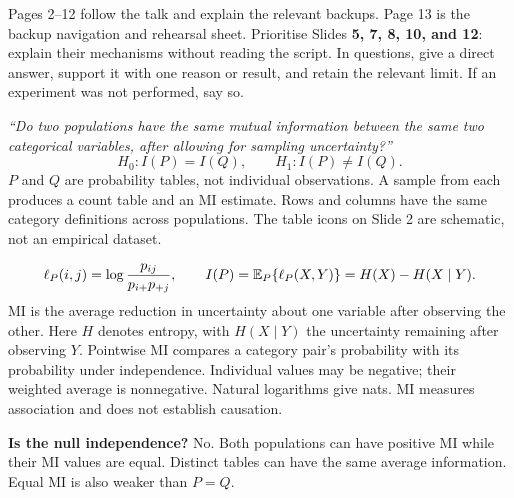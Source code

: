 Pages 2--12 follow the talk and explain the relevant backups. Page 13 is the backup navigation and rehearsal sheet. Prioritise Slides \textbf{5, 7, 8, 10, and 12}: explain their mechanisms without reading the script. In questions, give a direct answer, support it with one reason or result, and retain the relevant limit. If an experiment was not performed, say so.

\newpage
{}

\emph{``Do two populations have the same mutual information between the same two categorical variables, after allowing for sampling uncertainty?''}
\[
H_0:I(P)=I(Q),\qquad H_1:I(P)\ne I(Q).
\]
\(P\) and \(Q\) are probability tables, not individual observations. A sample from each produces a count table and an MI estimate. Rows and columns have the same category definitions across populations. The table icons on Slide 2 are schematic, not an empirical dataset.

\[
\ell_P(i,j)=\log\frac{p_{ij}}{p_{i+}p_{+j}},\qquad
I(P)=\mathbb E_P\{\ell_P(X,Y)\}=H(X)-H(X\mid Y).
\]
MI is the average reduction in uncertainty about one variable after observing the other. Here \(H\) denotes entropy, with \(H(X\mid Y)\) the uncertainty remaining after observing \(Y\). Pointwise MI compares a category pair's probability with its probability under independence. Individual values may be negative; their weighted average is nonnegative. Natural logarithms give nats. MI measures association and does not establish causation.

\textbf{Is the null independence?} No. Both populations can have positive MI while their MI values are equal. Distinct tables can have the same average information. Equal MI is also weaker than \(P=Q\).

